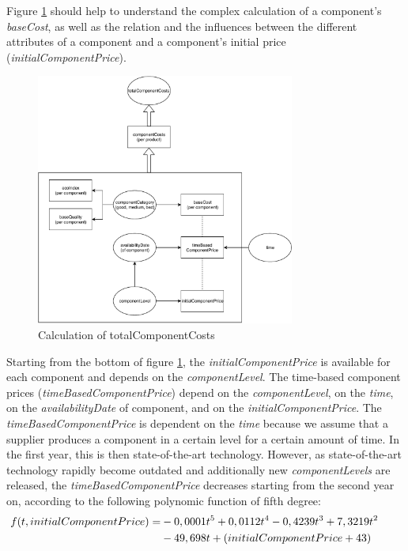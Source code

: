 Figure \ref{img:totalComponentCosts} should help to understand the complex calculation of a component's \textit{baseCost}, as well as the relation and the influences between the different attributes of a component and a component’s initial price (\textit{initialComponentPrice}).\\
\begin{figure}
	\centering
	\includegraphics[width=8.5cm]{images/totalComponentCosts.pdf}
	\caption{Calculation of totalComponentCosts}
	\label{img:totalComponentCosts}
\end{figure}
Starting from the bottom of figure \ref{img:totalComponentCosts}, the \textit{initialComponentPrice} is available for each component and depends on the \textit{componentLevel}.
The time-based component prices (\textit{timeBasedComponentPrice}) depend on the \textit{componentLevel}, on the \textit{time}, on the \textit{availabilityDate} of component, and on the \textit{initialComponentPrice}.
The \textit{timeBasedComponentPrice} is dependent on the \textit{time} because we assume that a supplier produces a component in a certain level for a certain amount of time. In the first year, this is then state-of-the-art technology. However, as state-of-the-art technology rapidly become outdated and additionally new \textit{componentLevels} are released, the \textit{timeBasedComponentPrice} decreases starting from the second year on, according to the following polynomic function of fifth degree:
\begin{equation}
\label{Function timeBoundComponentPrice}
\begin{aligned}
   f(t, initialComponentPrice) = & - 0,0001t\textsuperscript{5} + 0,0112t\textsuperscript{4} - 0,4239t\textsuperscript{3} + 7,3219t\textsuperscript{2} \\
   & - 49,698t + (initialComponentPrice+43)&& 
\end{aligned}   
\end{equation}

